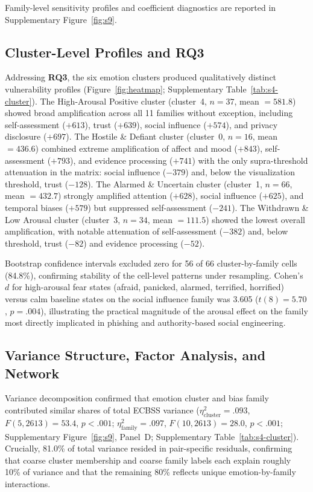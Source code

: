 \documentclass[12pt,a4paper]{article}
\newcommand{\ecbss}{\textsc{ECBSS}}
\begin{document}
Family-level sensitivity profiles and coefficient diagnostics are reported in Supplementary Figure~\ref{fig:s9}.

\subsection{Cluster-Level Profiles and RQ3}

Addressing \textbf{RQ3}, the six emotion clusters produced qualitatively distinct vulnerability profiles (Figure~\ref{fig:heatmap}; Supplementary Table~\ref{tab:s4-cluster}). The High-Arousal Positive cluster (cluster~4, $n = 37$, mean $= 581.8$) showed broad amplification across all 11 families without exception, including self-assessment ($+613$), trust ($+639$), social influence ($+574$), and privacy disclosure ($+697$). The Hostile \& Defiant cluster (cluster~0, $n = 16$, mean $= 436.6$) combined extreme amplification of affect and mood ($+843$), self-assessment ($+793$), and evidence processing ($+741$) with the only supra-threshold attenuation in the matrix: social influence ($-379$) and, below the visualization threshold, trust ($-128$). The Alarmed \& Uncertain cluster (cluster~1, $n = 66$, mean $= 432.7$) strongly amplified attention ($+628$), social influence ($+625$), and temporal biases ($+579$) but suppressed self-assessment ($-241$). The Withdrawn \& Low Arousal cluster (cluster~3, $n = 34$, mean $= 111.5$) showed the lowest overall amplification, with notable attenuation of self-assessment ($-382$) and, below threshold, trust ($-82$) and evidence processing ($-52$).

Bootstrap confidence intervals excluded zero for 56 of 66 cluster-by-family cells (84.8\%), confirming stability of the cell-level patterns under resampling. Cohen's $d$ for high-arousal fear states (afraid, panicked, alarmed, terrified, horrified) versus calm baseline states on the social influence family was 3.605 ($t(8) = 5.70$, $p = .004$), illustrating the practical magnitude of the arousal effect on the family most directly implicated in phishing and authority-based social engineering.

\subsection{Variance Structure, Factor Analysis, and Network}

Variance decomposition confirmed that emotion cluster and bias family contributed similar shares of total \ecbss{} variance ($\eta^2_{\text{cluster}} = .093$, $F(5, 2613) = 53.4$, $p < .001$; $\eta^2_{\text{family}} = .097$, $F(10, 2613) = 28.0$, $p < .001$; Supplementary Figure~\ref{fig:s9}, Panel~D; Supplementary Table~\ref{tab:s4-cluster}). Crucially, 81.0\% of total variance resided in pair-specific residuals, confirming that coarse cluster membership and coarse family labels each explain roughly 10\% of variance and that the remaining 80\% reflects unique emotion-by-family interactions.
\end{document}
